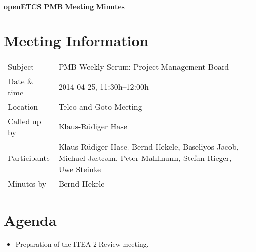 \documentclass[a4paper, 11pt]{article}
\begin{document}
{\begin{center}\huge\bf openETCS PMB Meeting Minutes\end{center}}
\section{Meeting Information}

\renewcommand{\arraystretch}{1.5}
\begin{supertabular}{m{.2\textwidth}m{.8\textwidth}}
Subject & PMB Weekly Scrum: Project Management Board\\
Date \& time & 2014-04-25, 11:30h--12:00h\\
Location & Telco and Goto-Meeting\\
Called up by & Klaus-R\"udiger Hase\\
Participants &
Klaus-R\"udiger Hase,
Bernd Hekele,
Baseliyos Jacob,
Michael Jastram,
Peter Mahlmann,
Stefan Rieger,
Uwe Steinke
\\

Minutes by & Bernd Hekele\\

\end{supertabular}
\renewcommand{\arraystretch}{1.0}


\section{{Agenda}}

\begin{itemize}
\item Preparation of the ITEA 2 Review meeting.
\end{itemize}
\end{document}
